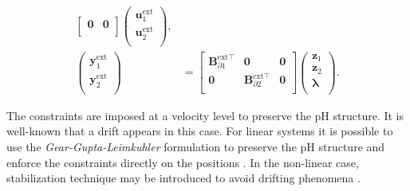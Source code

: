 \begin{equation}
\begin{aligned}
\begin{bmatrix}
\mathbf{0} & \mathbf{0} \\
\end{bmatrix} 
\begin{pmatrix}
\mathbf{u}_1^{\text{ext}} \\ 
\mathbf{u}_2^{\text{ext}} \\
\end{pmatrix}, \\
\begin{pmatrix}
\mathbf{y}_1^{\text{ext}} \\ \mathbf{y}_2^{\text{ext}} \\
\end{pmatrix}  &= \begin{bmatrix}
\mathbf{B}_{\partial 1}^{\text{ext} \top} & \mathbf{0} & \mathbf{0} \\
\mathbf{0} & \mathbf{B}_{\partial 2}^{\text{ext} \top} & \mathbf{0} \\
\end{bmatrix} \begin{pmatrix}
\mathbf{z}_1  \\ 
\mathbf{z}_2  \\ 
\bm{\lambda} \\
\end{pmatrix}.
\end{aligned}
\end{equation}

\begin{remark}
	The constraints  are imposed at a velocity level to preserve the pH structure. It is well-known that a drift appears in this case. For linear systems it is possible to use the \textit{Gear-Gupta-Leimkuhler} formulation to preserve the pH structure and enforce the constraints directly on the positions \cite{scholz2019}. In the non-linear case, stabilization technique may be introduced to avoid drifting phenomena \cite{bauchau2008review,laulusa2008review}. 
\end{remark}

